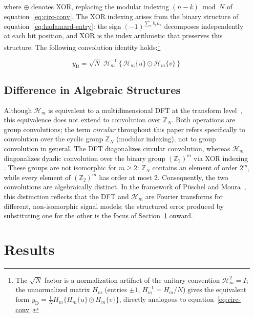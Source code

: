 \documentclass[11pt]{article}
\begin{document}
\noindent where $\oplus$ denotes XOR, replacing the modular indexing $(n-k)\bmod N$ of equation~\eqref{eq:circ-conv}. The XOR indexing arises from the binary structure of equation~\eqref{eq:hadamard-entry}: the sign $(-1)^{\sum_r k_r n_r}$ decomposes independently at each bit position, and XOR is the index arithmetic that preserves this structure. The following convolution identity holds:\footnote{The $\sqrt{N}$ factor is a normalization artifact of the unitary convention $\mathcal{H}_m^2 = I$; the unnormalized matrix $H_m$ (entries $\pm1$, $H_m^{-1} = H_m/N$) gives the equivalent form $y_{\mathrm{D}} = \tfrac{1}{N}H_m\{H_m\{u\} \odot H_m\{v\}\}$, directly analogous to equation~\eqref{eq:circ-conv}.}

\begin{equation}
      \label{eq:hadamard-thm}
      y_{\mathrm{D}} = \sqrt{N}\;\mathcal{H}_m^{-1}\!\left\{\mathcal{H}_m\{u\} \odot \mathcal{H}_m\{v\}\right\}
\end{equation}

\subsection{Difference in Algebraic Structures}
\label{sec:alg-structures}

Although $\mathcal{H}_m$ is equivalent to a multidimensional DFT at the transform level~\cite{shanks1969ITCmp.100.457S, yarlagadda1997hadamard}, this equivalence does not extend to convolution over $\mathbb{Z}_N$. Both operations are group convolutions; the term \emph{circular} throughout this paper refers specifically to convolution over the cyclic group $\mathbb{Z}_N$ (modular indexing), not to group convolution in general. The DFT diagonalizes circular convolution, whereas $\mathcal{H}_m$ diagonalizes dyadic convolution over the binary group $(\mathbb{Z}_2)^m$ via XOR indexing \cite{Terras_1999}. These groups are not isomorphic for $m \geq 2$: $\mathbb{Z}_N$ contains an element of order $2^m$, while every element of $(\mathbb{Z}_2)^m$ has order at most $2$. Consequently, the two convolutions are algebraically distinct. In the framework of P\"uschel and Moura~\cite{PueschelMoura2008_ASP_1DSpace, PueschelMoura2008_ASP_Foundation1DTime}, this distinction reflects that the DFT and $\mathcal{H}_m$ are Fourier transforms for different, non‑isomorphic signal models; the structured error produced by substituting one for the other is the focus of Section~\ref{sec:results} onward.

\section{Results}
\label{sec:results}
\end{document}
